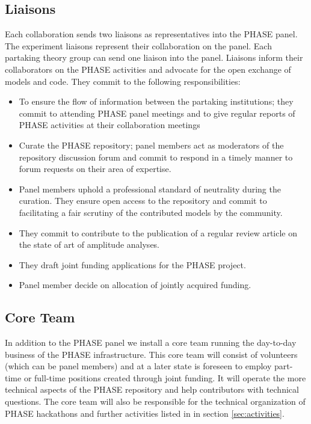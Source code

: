 \subsection{Liaisons}
Each collaboration sends two liaisons as representatives into the PHASE panel. The experiment liaisons represent their collaboration on the panel. Each partaking theory group can send one liaison into the panel. Liaisons inform their collaborators on the PHASE activities and advocate for the open exchange of models and code. They commit to the following responsibilities:
\begin{itemize}
\item To ensure the flow of information between the partaking institutions; they commit to attending PHASE panel meetings and to give regular reports of PHASE activities at their collaboration meetings
\item Curate the PHASE repository; panel members act as moderators of the repository discussion forum and commit to respond in a timely manner to forum requests on their area of expertise. 
\item Panel members uphold a professional standard of neutrality during the curation. They ensure open access to the repository and commit to facilitating a fair scrutiny of the contributed models by the community. 
\item They commit to contribute to the publication of a regular review article on the state of art of amplitude analyses.
\item They draft joint funding applications for the PHASE project.
\item Panel member decide on allocation of jointly acquired funding.
\end{itemize}

\subsection{Core Team}
In addition to the PHASE panel we install a core team running the day-to-day business of the PHASE infrastructure. This core team will consist of volunteers (which can be panel members) and at a later state is foreseen to employ part-time or full-time positions created through joint funding. It will operate the more technical aspects of the PHASE repository and help contributors with technical questions. The core team will also be responsible for the technical organization of PHASE hackathons and further activities listed in in section \ref{sec:activities}.

